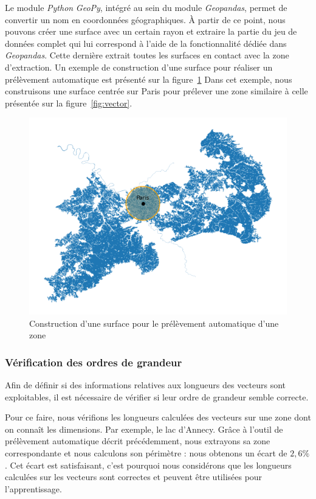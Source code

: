 Le module \emph{Python} \emph{GeoPy}, intégré au sein du module \emph{Geopandas}, permet de convertir un nom en coordonnées géographiques.
À partir de ce point, nous pouvons créer une surface avec un certain rayon et extraire la partie du jeu de données complet qui lui correspond à l'aide de la fonctionnalité dédiée dans \emph{Geopandas}.
Cette dernière extrait toutes les surfaces en contact avec la zone d'extraction.
Un exemple de construction d'une surface pour réaliser un prélèvement automatique est présenté sur la figure~\ref{fig:zone-paris}
Dans cet exemple, nous construisons une surface centrée sur Paris pour prélever une zone similaire à celle présentée sur la figure~\ref{fig:vector}.

\begin{figure}[!h]
    \centering
    \includegraphics[scale=0.5]{figures/zone-paris}
    \caption{Construction d'une surface pour le prélèvement automatique d'une zone}
    \label{fig:zone-paris}
\end{figure}


\subsubsection{Vérification des ordres de grandeur}

Afin de définir si des informations relatives aux longueurs des vecteurs sont exploitables, il est nécessaire de vérifier si leur ordre de grandeur semble correcte.

Pour ce faire, nous vérifions les longueurs calculées des vecteurs sur une zone dont on connaît les dimensions.
Par exemple, le lac d'Annecy.
Grâce à l'outil de prélèvement automatique décrit précédemment, nous extrayons sa zone correspondante et nous calculons son périmètre : nous obtenons un écart de $2,6\%$.
Cet écart est satisfaisant, c'est pourquoi nous considérons que les longueurs calculées sur les vecteurs sont correctes et peuvent être utilisées pour l'apprentissage.

